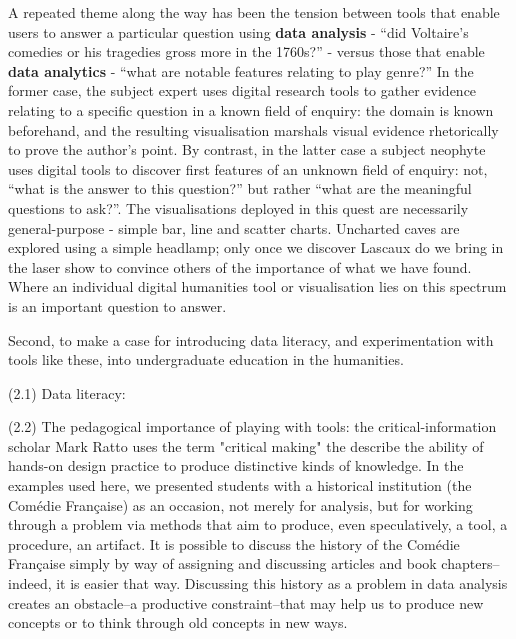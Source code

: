 \documentclass[	DIV=calc,%
							paper=a4,%
							fontsize=11pt,%
							twocolumn]{scrartcl}	 					%
\begin{document}
A repeated theme along the way has been the tension between tools that enable users to answer a particular question using \textbf{data analysis} - ``did Voltaire's comedies or his tragedies gross more in the 1760s?'' - versus those that enable \textbf{data analytics} - ``what are notable features relating to play genre?''  In the former case, the subject expert uses digital research tools to gather evidence relating to a specific question in a known field of enquiry: the domain is known beforehand, and the resulting visualisation marshals visual evidence rhetorically to prove the author's point.  By contrast, in the latter case a subject neophyte uses digital tools to discover first features of an unknown field of enquiry: not, ``what is the answer to this question?'' but rather ``what are the meaningful questions to ask?''.  The visualisations deployed in this quest are necessarily general-purpose - simple bar, line and scatter charts.  Uncharted caves are explored using a simple headlamp; only once we discover Lascaux do we bring in the laser show to convince others of the importance of what we have found.  Where an individual digital humanities tool or visualisation lies on this spectrum is an important question to answer.

Second, to make a case for introducing data literacy, and experimentation with tools like these, into undergraduate education in the humanities.

(2.1) Data literacy:

(2.2) The pedagogical importance of playing with tools: the critical-information scholar Mark Ratto uses the term "critical making" the describe the ability of hands-on design practice to produce distinctive kinds of knowledge.  In the examples used here, we presented students with a historical institution (the Comédie Française) as an occasion, not merely for analysis, but for working through a problem via methods that aim to produce, even speculatively, a tool, a procedure, an artifact.  It is possible to discuss the history of the Comédie Française simply by way of assigning and discussing articles and book chapters--indeed, it is easier that way.  Discussing this history as a problem in data analysis creates an obstacle--a productive constraint--that may help us to produce new concepts or to think through old concepts in new ways.
\end{document}
